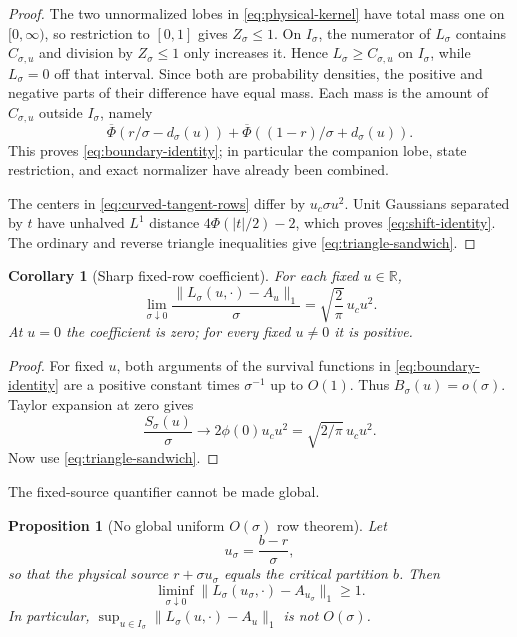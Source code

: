 \documentclass[11pt]{article}
\newtheorem{corollary}[theorem]{Corollary}
\newtheorem{proposition}[theorem]{Proposition}
\theoremstyle{definition}
\theoremstyle{remark}
\newcommand{\R}{\mathbb R}
\newcommand{\1}{\mathbf 1}
\begin{document}
\begin{proof}
The two unnormalized lobes in \eqref{eq:physical-kernel} have total mass one
on $[0,\infty)$, so restriction to $[0,1]$ gives $Z_\sigma\le1$.
On $I_\sigma$, the numerator of $L_\sigma$ contains
$C_{\sigma,u}$ and division by $Z_\sigma\le1$ only increases it.  Hence
$L_\sigma\ge C_{\sigma,u}$ on $I_\sigma$, while $L_\sigma=0$ off that
interval.  Since both are probability densities, the positive and negative
parts of their difference have equal mass.  Each mass is the amount of
$C_{\sigma,u}$ outside $I_\sigma$, namely
\[
 \overline\Phi(r/\sigma-d_\sigma(u))
 +\overline\Phi((1-r)/\sigma+d_\sigma(u)).
\]
This proves \eqref{eq:boundary-identity}; in particular the companion lobe,
state restriction, and exact normalizer have already been combined.

The centers in \eqref{eq:curved-tangent-rows} differ by
$u_c\sigma u^2$.  Unit Gaussians separated by $t$ have unhalved $L^1$
distance $4\Phi(|t|/2)-2$, which proves \eqref{eq:shift-identity}.
The ordinary and reverse triangle inequalities give
\eqref{eq:triangle-sandwich}.
\end{proof}

\begin{corollary}[Sharp fixed-row coefficient]\label{cor:fixed-row}
For each fixed $u\in\R$,
\begin{equation}\label{eq:fixed-row-limit}
 \boxed{
 \lim_{\sigma\downarrow0}
 \frac{\|L_\sigma(u,\cdot)-A_u\|_1}{\sigma}
 =\sqrt{\frac2\pi}\,u_cu^2.}
\end{equation}
At $u=0$ the coefficient is zero; for every fixed $u\ne0$ it is positive.
\end{corollary}

\begin{proof}
For fixed $u$, both arguments of the survival functions in
\eqref{eq:boundary-identity} are a positive constant times $\sigma^{-1}$
up to $O(1)$.  Thus $B_\sigma(u)=o(\sigma)$.  Taylor expansion at zero gives
\[
 \frac{S_\sigma(u)}\sigma
 \longrightarrow 2\phi(0)u_cu^2
 =\sqrt{2/\pi}\,u_cu^2.
\]
Now use \eqref{eq:triangle-sandwich}.
\end{proof}

The fixed-source quantifier cannot be made global.

\begin{proposition}[No global uniform $O(\sigma)$ row theorem]
\label{prop:global-obstruction}
Let
\[
 u_\sigma=\frac{b-r}{\sigma},
\]
so that the physical source $r+\sigma u_\sigma$ equals the critical
partition $b$.  Then
\begin{equation}\label{eq:global-obstruction}
 \liminf_{\sigma\downarrow0}
 \|L_\sigma(u_\sigma,\cdot)-A_{u_\sigma}\|_1\ge1.
\end{equation}
In particular,
$\sup_{u\in I_\sigma}\|L_\sigma(u,\cdot)-A_u\|_1$ is not
$O(\sigma)$.
\end{proposition}
\end{document}
